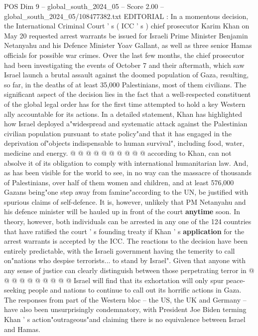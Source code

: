 \begin{textsample}{POS Dim 9 – global\_south\_2024\_05 – Score 2.00 – global\_south\_2024\_05/108477382.txt}  \label{ex:f9_pos_036}
EDITORIAL : In a momentous decision, the International Criminal Court ' s ( ICC ' s ) chief prosecutor Karim Khan on May 20 requested arrest warrants be issued for Israeli Prime Minister Benjamin Netanyahu and his Defence Minister Yoav Gallant, as well as three senior Hamas officials for possible war crimes.
Over the last few months, the chief prosecutor had been investigating the events of October 7 and their aftermath, which saw Israel launch a brutal assault against the doomed population of Gaza, resulting, so far, in the deaths of at least 35,000 Palestinians, most of them civilians.
The significant aspect of the decision lies in the fact that a well-respected constituent of the global legal order has for the first time attempted to hold a key Western ally accountable for its actions.
In a detailed statement, Khan has highlighted how Israel deployed a"widespread and systematic attack against the Palestinian civilian population pursuant to state policy"and that it has engaged in the deprivation of"objects indispensable to human survival", including food, water, medicine and energy. @ @ @ @ @ @ @ @ @ @ according to Khan, can not absolve it of its obligation to comply with international humanitarian law.
And, as has been visible for the world to see, in no way can the massacre of thousands of Palestinians, over half of them women and children, and at least 576,000 Gazans being"one step away from famine"according to the UN, be justified with spurious claims of self-defence.
It is, however, unlikely that PM Netanyahu and his defence minister will be hauled up in front of the court \textbf{anytime} soon.
In theory, however, both individuals can be arrested in any one of the 124 countries that have ratified the court ' s founding treaty if Khan ' s \textbf{application} for the arrest warrants is accepted by the ICC.
The reactions to the decision have been entirely predictable, with the Israeli government having the temerity to call on"nations who despise terrorists... to stand by Israel".
Given that anyone with any sense of justice can clearly distinguish between those perpetrating terror in @ @ @ @ @ @ @ @ @ @ Israel will find that its exhortation will only spur peace-seeking people and nations to continue to call out its horrific actions in Gaza.
The responses from part of the Western bloc -- the US, the UK and Germany -- have also been unsurprisingly condemnatory, with President Joe Biden terming Khan ' s action"outrageous"and claiming there is no equivalence between Israel and Hamas.

\end{textsample}
